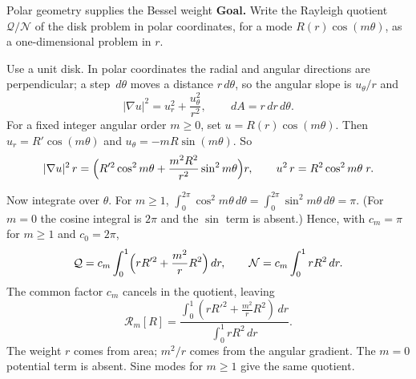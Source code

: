 \documentclass[11pt]{beamer}
\newcommand{\dd}{\,d}
\newcommand{\Q}{\mathcal Q}
\newcommand{\N}{\mathcal N}
\newcommand{\R}{\mathcal R}
\begin{document}
\begin{frame}[allowframebreaks=1.00]{Polar geometry supplies the Bessel weight}
\small
\textbf{Goal.} Write the Rayleigh quotient $\Q/\N$ of the disk problem in polar coordinates, for a
mode $R(r)\cos(m\theta)$, as a one-dimensional problem in $r$.

Use a unit disk. In polar coordinates the radial and angular directions are perpendicular; a step $\dd\theta$ moves a distance $r\dd\theta$, so the angular slope is $u_\theta/r$ and
\[
 |\nabla u|^2=u_r^2+\frac{u_\theta^2}{r^2},\qquad \dd A=r\dd r\dd\theta.
\]
For a fixed integer angular order $m\ge0$, set $u=R(r)\cos(m\theta)$. Then
$u_r=R'\cos(m\theta)$ and $u_\theta=-mR\sin(m\theta)$.
So
\[
 |\nabla u|^2\,r=\Bigl(R'^2\cos^2 m\theta+\frac{m^2R^2}{r^2}\sin^2m\theta\Bigr)r,
 \qquad u^2\,r=R^2\cos^2m\theta\;r .
\]
\par\framebreak\par
Now integrate over \(\theta\). For \(m\ge1\), \(\int_0^{2\pi}\cos^2m\theta\,d\theta=\int_0^{2\pi}\sin^2m\theta\,d\theta=\pi\). (For
\(m=0\) the cosine integral is \(2\pi\) and the \(\sin\) term is absent.) Hence, with \(c_m=\pi\) for \(m\ge1\) and
\(c_0=2\pi\),
\[
 \Q=c_m\int_0^1\Bigl(rR'^2+\frac{m^2}{r}R^2\Bigr)\dd r,\qquad \N=c_m\int_0^1rR^2\dd r .
\]
The common factor \(c_m\) cancels in the quotient, leaving
\begin{equation}
 \R_m[R]=
 \frac{\displaystyle\int_0^1\left(rR'^2+\frac{m^2}{r}R^2\right)\dd r}
      {\displaystyle\int_0^1rR^2\dd r}.\label{eq:radial-quotient}
\end{equation}
The weight $r$ comes from area; $m^2/r$ comes from the angular gradient.
The $m=0$ potential term is absent. Sine modes for $m\ge1$ give the same quotient.
\end{frame}
\end{document}

